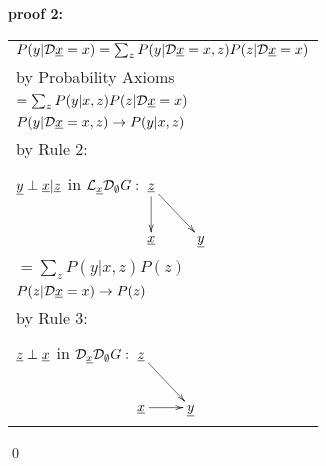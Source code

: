 {\bf * proof 2:}
\begin{longtable}{l}
\color{red}
$P(y|{\cal D}{\underline{x}}=x)
=
\sum_z
P(y|{\cal D}{\underline{x}}=x, z)
P(z|{\cal D}{\underline{x}}=x)$
\\
\quad by Probability Axioms
\\
\color{red}
$=\sum_z
P(y|x, z)
P(z|{\cal D}{\underline{x}}=x)$
\\
\quad $P(y|{\cal D} {\underline{x}}=x, z)\rightarrow
P(y|x, z)$
\\
\quad  by Rule 2:
\begin{tabular}{l}
\\
\end{tabular}
\\
\quad
${\underline{y}}\perp{\underline{x}}|{\underline{z}}$ in
$\call_\rvx\cald_\emptyset G:
\xymatrix{
\rvz\ar[d]\ar[rd]
\\
\rvx
&\rvy
}$
\\
\color{red}
$=\sum_z
P(y|x, z)
P(z)$
\\
\quad $P(z|{\cal D} {\underline{x}}=x)\rightarrow
P(z)$
\\
\quad  by Rule 3:
\begin{tabular}{l}
\\
\end{tabular}
\\
\quad
${\underline{z}}\perp {\underline{x}}$ in
$\cald_\rvx \cald_\emptyset G:
\xymatrix{
\rvz\ar[rd]
\\
\rvx\ar[r]
&\rvy
}
$
\end{longtable}
\qed


\begin{claim}
\label{cl-decFrontDoor}
\decFrontDoor
\end{claim}

\proof


